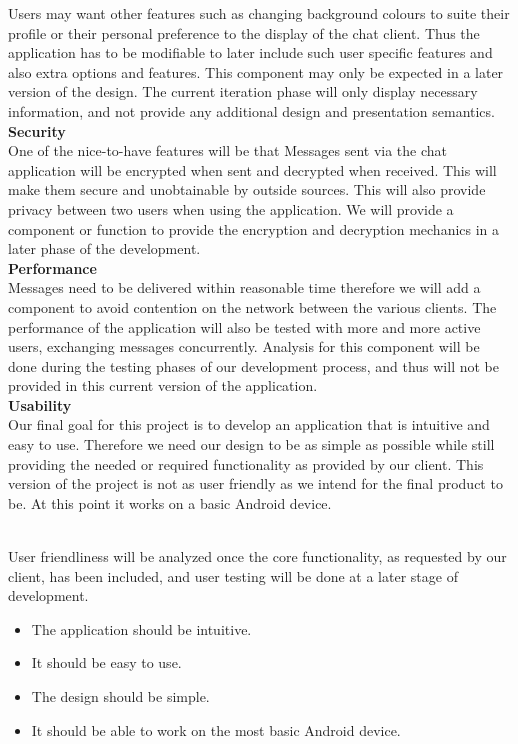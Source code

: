 \documentclass[29pt,a4paper]{moderncv}
\begin{document}
			Users may want other features such as changing background colours to suite their profile or their personal preference to the display of the chat client. Thus the application has to be modifiable to later include such user specific features and also extra options and features.  This component may only be expected in a later version of the design.  The current iteration phase will only display necessary information, and not provide any additional design and presentation semantics.
			\\  			
			
			\noindent\textbf{Security}\\
				One of the nice-to-have features will be that Messages sent via the chat application will be encrypted when sent and decrypted when received. This will make them secure and unobtainable by outside sources. This will also provide privacy between two users when using the application. We will provide a component or function to provide the encryption and decryption mechanics in a later phase of the development.\\
			
			\noindent\textbf{Performance}\\
				Messages need to be delivered within reasonable time therefore we will add a component to avoid contention on the network between the various clients. The performance of the application will also be tested with more and more active users, exchanging messages concurrently. Analysis for this component will be done during the testing phases of our development process, and thus will not be provided in this current version of the application.\\
				
			\noindent\textbf{Usability}
				\\Our final goal for this project is to develop an application that is intuitive and easy to use.  Therefore we need our design to be as simple as possible while still providing the needed or required functionality as provided by our client.  This version of the project is not as user friendly as we intend for the final product to be.  At this point it works on a basic Android device.  
				
				\\User friendliness will be analyzed once the core functionality, as requested by our client, has been included, and user testing will be done at a later stage of development.
				\begin{itemize}
					\item The application should be intuitive.
					\item It should be easy to use.
					\item The design should be simple.
					\item It should be able to work on the most basic Android device.\\
				\end{itemize}
				
\end{document}
